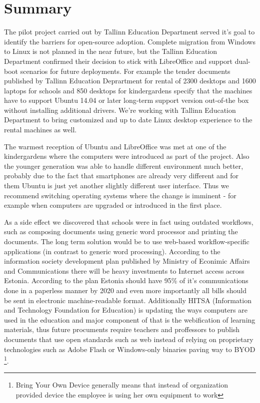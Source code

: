 \documentclass{article}
\begin{document}
\section{Summary}

The pilot project carried out by Tallinn Education Department
served it's goal to identify the barriers for open-source adoption.
Complete migration from Windows to Linux is not planned in the
near future, but the Tallinn Education Department confirmed
their decision to stick with LibreOffice and
support dual-boot scenarios for future deployments.
For example the tender documents published by
Tallinn Education Deprartment for rental of
2300 desktops and 1600 laptops for schools
\cite{arvutite-rentimine-koolidele} and
850 desktops for kindergardens
\cite{arvutite-rentimine-lasteaedadele}
specify that the machines have to support
Ubuntu 14.04 or later long-term support version out-of-the box
without installing additional drivers.
We're working with Tallinn Education Department
to bring customized and up to date Linux desktop experience
to the rental machines as well.

The warmest reception of Ubuntu and LibreOffice
was met at one of the kindergardens where the computers were
introduced as part of the project.
Also the younger generation was able to handle
different environment much better,
probably due to the fact that smartphones
are already very different and for them Ubuntu
is just yet another slightly different user interface.
Thus we recommend switching operating systems
where the change is imminent -
for example when computers are upgraded or introduced in the
first place.

As a side effect we discovered that schools were in fact
using outdated workflows, such as composing documents using
generic word processor and printing the documents.
The long term solution would be to use web-based
workflow-specific applications (in contrast
to generic word processing).
According to the
information society development plan
\cite{eesti-infouhiskonna-arengukava} published by
Ministry of Econimic Affairs and Communications
there will be heavy investments to Internet access across Estonia.
According to the plan Estonia should have 95\% of
it's communications done in a paperless manner by 2020 and
even more importantly all bills should be sent in
electronic machine-readable format.
Additionally HITSA (Information and Technology Foundation for Education)
is updating the ways computers are used in the education
and major component of that is the webification of
learning materials, thus future procuments require
teachers and proffessors to publish documents that
use open standards such as web instead of relying on
proprietary technologies such as Adobe Flash or
Windows-only binaries paving way to BYOD
\footnote{Bring Your Own Device generally means that instead of
organization provided device the employee is using her own
equipment to work}.
\end{document}
